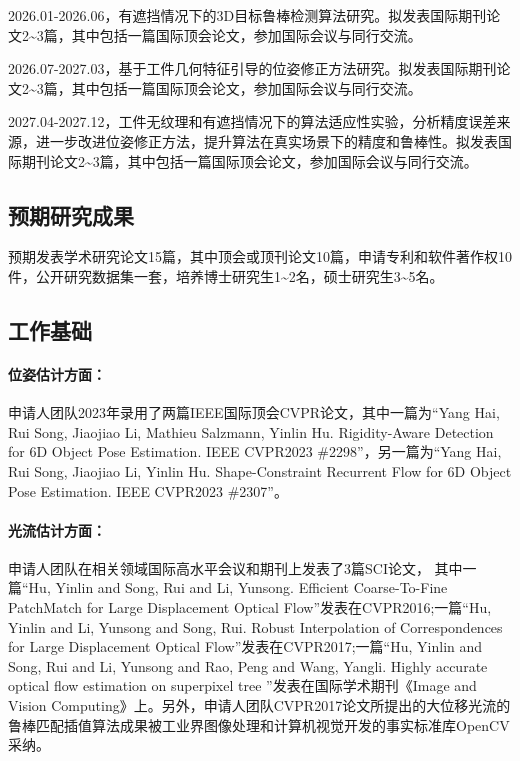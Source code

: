 \documentclass[12pt]{article}
\newcommand{\myPara}[1]{\paragraph{#1：}}
\begin{document}
2026.01-2026.06，有遮挡情况下的3D目标鲁棒检测算法研究。拟发表国际期刊论文2\textasciitilde3篇，其中包括一篇国际顶会论文，参加国际会议与同行交流。

2026.07-2027.03，基于工件几何特征引导的位姿修正方法研究。拟发表国际期刊论文2\textasciitilde3篇，其中包括一篇国际顶会论文，参加国际会议与同行交流。

2027.04-2027.12，工件无纹理和有遮挡情况下的算法适应性实验，分析精度误差来源，进一步改进位姿修正方法，提升算法在真实场景下的精度和鲁棒性。拟发表国际期刊论文2\textasciitilde3篇，其中包括一篇国际顶会论文，参加国际会议与同行交流。

\subsection{预期研究成果}

预期发表学术研究论文15篇，其中顶会或顶刊论文10篇，申请专利和软件著作权10件，公开研究数据集一套，培养博士研究生1\textasciitilde2名，硕士研究生3\textasciitilde5名。




\subsection{工作基础}


\myPara{位姿估计方面}申请人团队2023年录用了两篇IEEE国际顶会CVPR论文，其中一篇为“Yang Hai, Rui Song, Jiaojiao Li, Mathieu Salzmann, Yinlin Hu. Rigidity-Aware Detection for 6D Object Pose Estimation. IEEE CVPR2023 \#2298”，另一篇为“Yang Hai, Rui Song, Jiaojiao Li, Yinlin Hu. Shape-Constraint Recurrent Flow for 6D Object Pose Estimation. IEEE CVPR2023 \#2307”。

\myPara{光流估计方面}
申请人团队在相关领域国际高水平会议和期刊上发表了3篇SCI论文，
其中一篇“Hu, Yinlin and Song, Rui and Li, Yunsong. Efficient Coarse-To-Fine PatchMatch for Large Displacement Optical Flow”发表在CVPR2016;一篇“Hu, Yinlin and Li, Yunsong and Song, Rui. Robust Interpolation of Correspondences for Large Displacement Optical Flow”发表在CVPR2017;一篇“Hu, Yinlin and Song, Rui and Li, Yunsong and Rao, Peng and Wang, Yangli. Highly accurate optical flow estimation on superpixel tree ”发表在国际学术期刊《Image and Vision Computing》上。另外，申请人团队CVPR2017论文所提出的大位移光流的鲁棒匹配插值算法成果被工业界图像处理和计算机视觉开发的事实标准库OpenCV采纳。
\end{document}

